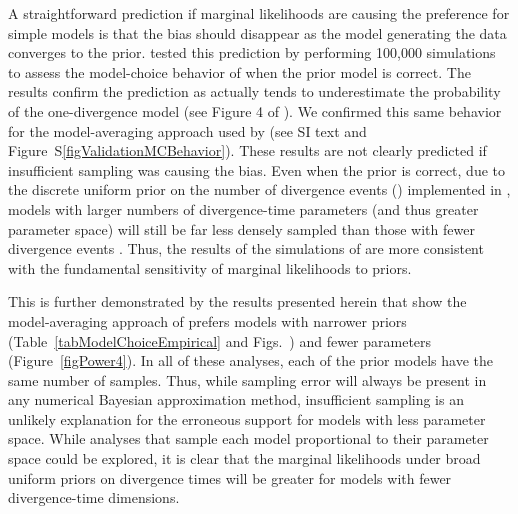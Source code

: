 A straightforward prediction if marginal likelihoods are causing the preference
for simple models is that the bias should disappear as the model generating the
data converges to the prior.
\citet{Oaks2012} tested this prediction by performing 100,000 simulations to
assess the model-choice behavior of \msb when the prior model is correct.
The results confirm the prediction as \msb actually tends to underestimate
the probability of the one-divergence model (see Figure 4 of
\citet{Oaks2012}).
We confirmed this same behavior for the model-averaging approach used by
\citet{Hickerson2013} (see SI text and Figure~S\ref{figValidationMCBehavior}).
These results are not clearly predicted if insufficient sampling was causing
the bias.
Even when the prior is correct, due to the discrete uniform prior on the number
of divergence events (\numt{}) implemented in \msb, models with larger numbers
of divergence-time parameters (and thus greater parameter space) will still be
far less densely sampled than those with fewer divergence events
\citep{Oaks2012}.
Thus, the results of the simulations of \citet{Oaks2012} are more consistent
with the fundamental sensitivity of marginal likelihoods to priors.

This is further demonstrated by the results presented herein that show the
model-averaging approach of \citet{Hickerson2013} prefers models with narrower
\divt{} priors (Table~\ref{tabModelChoiceEmpirical} and
Figs.~)
and fewer \divt{} parameters (Figure~\ref{figPower4}).
In all of these analyses, each of the prior models have the same number of
samples.
Thus, while sampling error will always be present in any numerical Bayesian
approximation method, insufficient sampling is an unlikely explanation for the
erroneous support for models with less parameter space.
While analyses that sample each model proportional to their parameter space
could be explored, it is clear that the marginal likelihoods under broad
uniform priors on divergence times will be greater for models with fewer
divergence-time dimensions.




